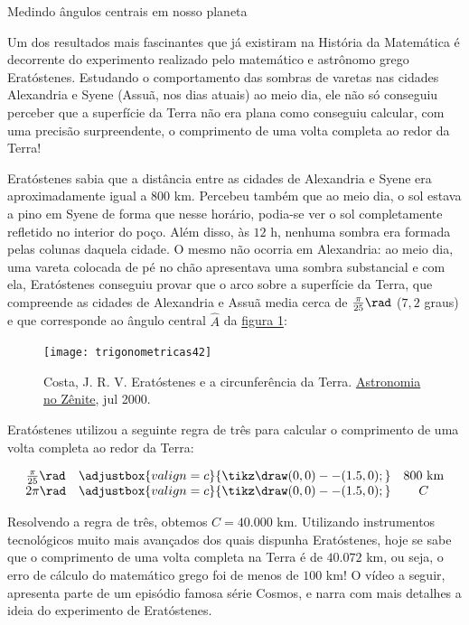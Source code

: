 \begin{task}{Medindo ângulos centrais em nosso planeta}
\label{trig-ativ9}

Um dos resultados mais fascinantes que já existiram na História da Matemática é decorrente do experimento realizado pelo matemático e astrônomo grego Eratóstenes. Estudando o comportamento das sombras de varetas nas cidades Alexandria e Syene (Assuã, nos dias atuais) ao meio dia, ele não só conseguiu perceber que a superfície da Terra não era plana como conseguiu calcular, com uma precisão surpreendente, o comprimento de uma volta completa ao redor da Terra!

Eratóstenes sabia que a distância entre as cidades de Alexandria e Syene era aproximadamente igual a $800$ km. Percebeu também que ao meio dia, o sol estava a pino em Syene de forma que nesse horário, podia-se ver o sol completamente refletido no interior do poço. Além disso, às $12$ h, nenhuma sombra era formada pelas colunas daquela cidade. O mesmo não ocorria em Alexandria: ao meio dia, uma vareta colocada de pé no chão apresentava uma sombra substancial e com ela, Eratóstenes conseguiu provar que o arco sobre a superfície da Terra, que compreende as cidades de Alexandria e Assuã media cerca de $\frac{\pi}{25}\rad$ ($7{,}2$ graus) e que corresponde ao ângulo central $\hat{A}$ da \hyperref[zenite]{figura \ref{zenite}}:

\begin{figure}[H]
\centering

\texttt{[image: trigonometricas42]}
\caption{Costa, J. R. V. Eratóstenes e a circunferência da Terra. \href{https://www.zenite.nu/eratostenes-e-a-circunferencia-da-terra/}{Astronomia no Zênite}, jul 2000.}
\label{zenite}
\end{figure}

Eratóstenes utilizou a seguinte regra de três para calcular o comprimento de uma volta completa ao redor da Terra:


\begin{equation*}
\begin{array}{ccc}
\frac{\pi}{25} \rad & \adjustbox{valign=c}{\tikz \draw (0,0) -- (1.5,0);} & 800 \text{ km} \\
2\pi\rad & \adjustbox{valign=c}{\tikz \draw (0,0) -- (1.5,0);} & C 
\end{array}
\end{equation*}

Resolvendo a regra de três, obtemos $C = 40.000$ km. Utilizando instrumentos tecnológicos muito mais avançados dos quais dispunha Eratóstenes, hoje se sabe que o comprimento de uma volta completa na Terra é de $40.072$ km, ou seja, o erro de cálculo do matemático grego foi de menos de $100$ km! O vídeo a seguir, apresenta parte de um episódio famosa série Cosmos, e narra com mais detalhes a ideia do experimento de Eratóstenes.


\end{task}
